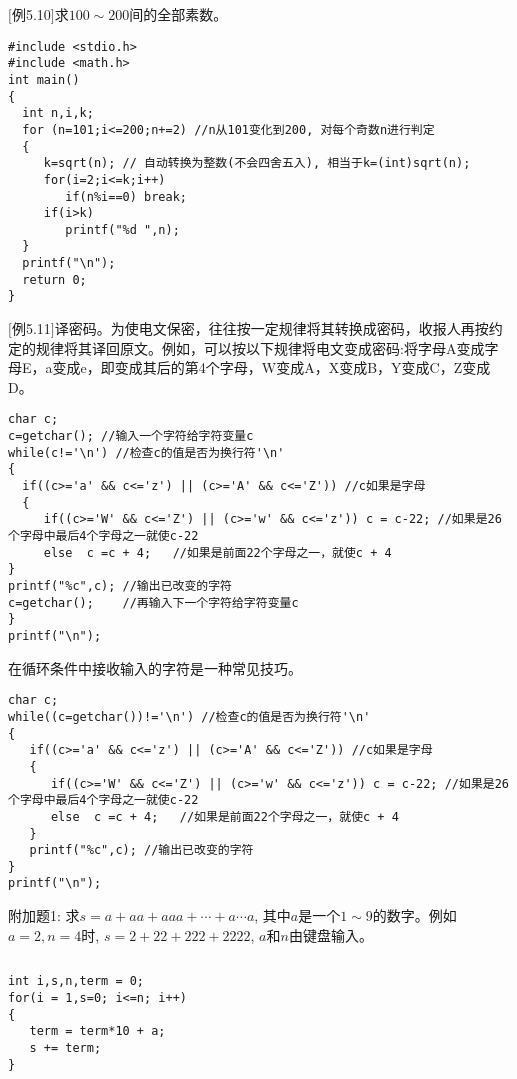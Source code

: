 \begin{frame}
\small
$[$例5.10$]$求$100\sim 200$间的全部素数。
\begin{lstlisting}
#include <stdio.h>
#include <math.h>
int main()
{
  int n,i,k;
  for (n=101;i<=200;n+=2) //n从101变化到200, 对每个奇数n进行判定
  {
     k=sqrt(n); // 自动转换为整数(不会四舍五入), 相当于k=(int)sqrt(n);
     for(i=2;i<=k;i++)
        if(n%i==0) break;
     if(i>k) 
        printf("%d ",n);
  }
  printf("\n");
  return 0;
}
\end{lstlisting}
\end{frame}

\begin{frame}
\small
$[$例5.11$]$译密码。为使电文保密，往往按一定规律将其转换成密码，收报人再按约定的规律将其译回原文。例如，可以按以下规律将电文变成密码:将字母A变成字母E，a变成e，即变成其后的第4个字母，W变成A，X变成B，Y变成C，Z变成D。
\begin{lstlisting}
char c;
c=getchar(); //输入一个字符给字符变量c
while(c!='\n') //检查c的值是否为换行符'\n'  
{
  if((c>='a' && c<='z') || (c>='A' && c<='Z')) //c如果是字母
  {
     if((c>='W' && c<='Z') || (c>='w' && c<='z')) c = c-22; //如果是26个字母中最后4个字母之一就使c-22
     else  c =c + 4;   //如果是前面22个字母之一，就使c + 4
}
printf("%c",c); //输出已改变的字符
c=getchar();    //再输入下一个字符给字符变量c
}
printf("\n");
\end{lstlisting}
\end{frame}

\begin{frame}
在循环条件中接收输入的字符是一种常见技巧。
\begin{lstlisting}
char c;
while((c=getchar())!='\n') //检查c的值是否为换行符'\n'  
{
   if((c>='a' && c<='z') || (c>='A' && c<='Z')) //c如果是字母
   {
      if((c>='W' && c<='Z') || (c>='w' && c<='z')) c = c-22; //如果是26个字母中最后4个字母之一就使c-22
      else  c =c + 4;   //如果是前面22个字母之一，就使c + 4
   }
   printf("%c",c); //输出已改变的字符
}
printf("\n");
\end{lstlisting}
\end{frame}

\begin{frame}[fragile]
附加题1: 求$s=a+aa+aaa+\cdots+a\cdots a$, 其中$a$是一个$1\sim 9$的数字。例如$a=2, n=4$时, $s=2+22+222+2222$, $a$和$n$由键盘输入。
\pause
\begin{columns}
\begin{lstlisting}
int i,s,n,term = 0;
for(i = 1,s=0; i<=n; i++) 
{
   term = term*10 + a;
   s += term; 
}
\end{lstlisting}
\end{columns}
\end{frame}

